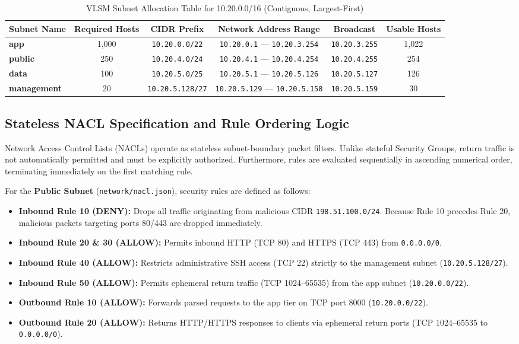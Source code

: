 \documentclass[10pt,a4paper]{article}
\begin{document}
\begin{table}[h!]
\centering
\small
\caption{VLSM Subnet Allocation Table for 10.20.0.0/16 (Contiguous, Largest-First)}
\vspace{0.1cm}
\begin{tabular*}{\textwidth}{@{\extracolsep{\fill}}lccccc@{}}
\toprule
\textbf{Subnet Name} & \textbf{Required Hosts} & \textbf{CIDR Prefix} & \textbf{Network Address Range} & \textbf{Broadcast} & \textbf{Usable Hosts} \\
\midrule
\textbf{app} & 1,000 & \texttt{10.20.0.0/22} & \texttt{10.20.0.1} --- \texttt{10.20.3.254} & \texttt{10.20.3.255} & 1,022 \\
\textbf{public} & 250 & \texttt{10.20.4.0/24} & \texttt{10.20.4.1} --- \texttt{10.20.4.254} & \texttt{10.20.4.255} & 254 \\
\textbf{data} & 100 & \texttt{10.20.5.0/25} & \texttt{10.20.5.1} --- \texttt{10.20.5.126} & \texttt{10.20.5.127} & 126 \\
\textbf{management} & 20 & \texttt{10.20.5.128/27} & \texttt{10.20.5.129} --- \texttt{10.20.5.158} & \texttt{10.20.5.159} & 30 \\
\bottomrule
\end{tabular*}
\end{table}

\subsection{Stateless NACL Specification and Rule Ordering Logic}
Network Access Control Lists (NACLs) operate as stateless subnet-boundary packet filters. Unlike stateful Security Groups, return traffic is not automatically permitted and must be explicitly authorized. Furthermore, rules are evaluated sequentially in ascending numerical order, terminating immediately on the first matching rule.

For the \textbf{Public Subnet} (\texttt{network/nacl.json}), security rules are defined as follows:
\begin{itemize}[noitemsep,topsep=2pt,leftmargin=*]
    \item \textbf{Inbound Rule 10 (DENY):} Drops all traffic originating from malicious CIDR \texttt{198.51.100.0/24}. Because Rule 10 precedes Rule 20, malicious packets targeting ports 80/443 are dropped immediately.
    \item \textbf{Inbound Rule 20 \& 30 (ALLOW):} Permits inbound HTTP (TCP 80) and HTTPS (TCP 443) from \texttt{0.0.0.0/0}.
    \item \textbf{Inbound Rule 40 (ALLOW):} Restricts administrative SSH access (TCP 22) strictly to the management subnet (\texttt{10.20.5.128/27}).
    \item \textbf{Inbound Rule 50 (ALLOW):} Permits ephemeral return traffic (TCP 1024--65535) from the app subnet (\texttt{10.20.0.0/22}).
    \item \textbf{Outbound Rule 10 (ALLOW):} Forwards parsed requests to the app tier on TCP port 8000 (\texttt{10.20.0.0/22}).
    \item \textbf{Outbound Rule 20 (ALLOW):} Returns HTTP/HTTPS responses to clients via ephemeral return ports (TCP 1024--65535 to \texttt{0.0.0.0/0}).
\end{itemize}
\end{document}
